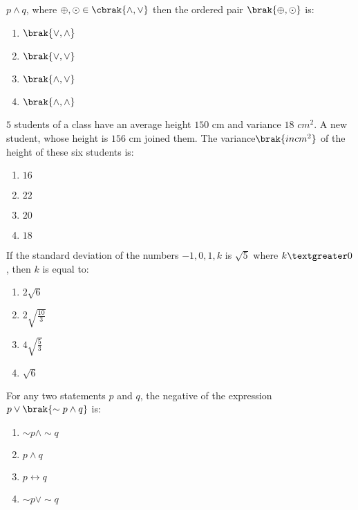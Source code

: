 $p\wedge q$, where $\oplus,\odot\in \cbrak{\wedge,\vee}$ then the ordered pair $\brak{\oplus,\odot}$ is:
\hfill{}
\begin{enumerate}
    \item $\brak{\vee,\wedge}$
    \item $\brak{\vee,\vee}$
    \item $\brak{\wedge,\vee}$
    \item $\brak{\wedge,\wedge}$ 
\end{enumerate}
\item  $5$ students of a class have an average height $150$ cm and variance $18$ $cm^2$. A new student, whose height is $156$ cm joined them. The variance$\brak{in cm^2}$ of the height of these six students is:\hfill{} 
\begin{enumerate}
    \item $16$
    \item $22$
    \item $20$
    \item $18$
\end{enumerate}
\item If the standard deviation of the numbers $-1,0,1,k$ is $\sqrt{5}$ where $k \textgreater 0$, then $k$ is equal to:\hfill{}
\begin{enumerate}
    \item $2\sqrt{6}$
    \item $2\sqrt{\frac{10}{3}}$
    \item $4\sqrt{\frac{5}{3}}$
    \item $\sqrt{6}$ 
\end{enumerate}
\item For any two statements $p$ and $q$, the negative of the expression $p\vee\brak{\sim p\wedge q}$ is:\hfill{}
\begin{enumerate}
    \item $\sim p\wedge\sim q$
    \item $p\wedge q$
    \item $p\leftrightarrow q$
    \item $\sim p\vee\sim q$ 
\end{enumerate}
    
%
